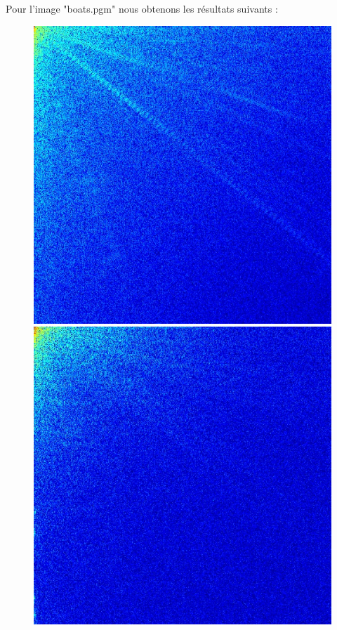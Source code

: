 \documentclass[12pt]{report}
\begin{document}
Pour l'image "boats.pgm" nous obtenons les résultats suivants :

\begin{figure}[H]
\begin{center}
\includegraphics[scale=0.25]{../ImageRes/dct_0.jpg} 
\includegraphics[scale=0.25]{../ImageRes/dct_1.jpg} 

\end{center}
\end{figure}
\end{document}
